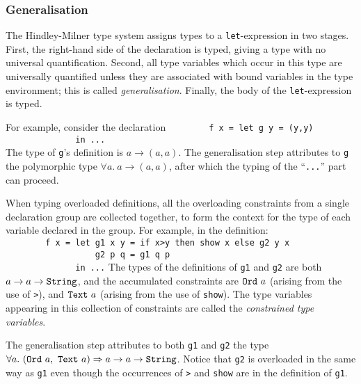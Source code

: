 \subsubsection{Generalisation}
\label{generalisation}

The Hindley-Milner type system assigns types to a \mbox{\tt let}-expression
in two stages.
First, the right-hand side of the declaration is typed, giving a type with
no universal quantification.  Second, all type variables which occur in this
type are universally quantified unless they are associated with
bound variables in the type environment;
this is called {\em generalisation}.
Finally, the body of the \mbox{\tt let}-expression is typed.

For example, consider the declaration
\bprog
\mbox{\tt \ \ \ \ \ \ \ \ f\ x\ =\ let\ g\ y\ =\ (y,y)}\\
\mbox{\tt \ \ \ \ \ \ \ \ \ \ \ \ \ \ in\ ...}\\
\mbox{\tt }
\eprog
The type of \mbox{\tt g}'s definition is 
$a \rightarrow (a,a)$.  The generalisation step
attributes to \mbox{\tt g} the polymorphic type 
$\forall a.~ a \rightarrow (a,a)$,
after which the typing of the ``\mbox{\tt ...}'' part can proceed.

When typing overloaded definitions, all the overloading 
constraints from a single declaration group are collected together, 
to form the context for the type of each variable declared in the group.
For example, in the definition:
\bprog
\mbox{\tt \ \ \ \ \ \ \ \ f\ x\ =\ let\ g1\ x\ y\ =\ if\ x>y\ then\ show\ x\ else\ g2\ y\ x}\\
\mbox{\tt \ \ \ \ \ \ \ \ \ \ \ \ \ \ \ \ \ \ g2\ p\ q\ =\ g1\ q\ p}\\
\mbox{\tt \ \ \ \ \ \ \ \ \ \ \ \ \ \ in\ ...}
\eprog
The types of the definitions of \mbox{\tt g1} and \mbox{\tt g2} are both
$a \rightarrow a \rightarrow \mbox{\tt String}$, and the accumulated constraints are
$\mbox{\tt Ord}~a$ (arising from the use of \mbox{\tt >}), and $\mbox{\tt Text}~a$ (arising from the
use of \mbox{\tt show}).
The type variables appearing in this collection of constraints are
called the {\em constrained type variables}.

The generalisation step attributes to both \mbox{\tt g1} and \mbox{\tt g2} the type
$\forall a.~(\mbox{\tt Ord}~a,~\mbox{\tt Text}~a) \Rightarrow 
a \rightarrow a \rightarrow \mbox{\tt String}$.
Notice that \mbox{\tt g2} is overloaded in the same way as \mbox{\tt g1} even though the
occurrences of \mbox{\tt >} and \mbox{\tt show} are in the definition of \mbox{\tt g1}.

